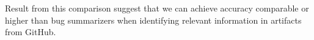 



Result from this comparison suggest that we can achieve accuracy comparable or higher than 
bug summarizers when identifying relevant information in artifacts from GitHub.





























